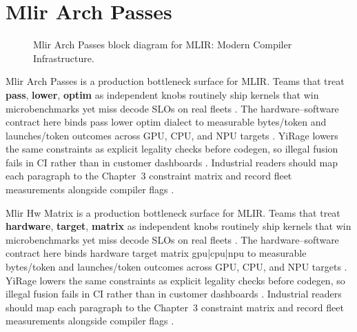 \section{Mlir Arch Passes}
\label{sec:mlir_arch_passes}
\begin{figure}[t]
\centering
{}
\caption{Mlir Arch Passes block diagram for MLIR: Modern Compiler Infrastructure.}
\label{fig:mlir_arch_passes_architecture}
\end{figure}


Mlir Arch Passes is a production bottleneck surface for MLIR. Teams that treat \textbf{pass}, \textbf{lower}, \textbf{optim} as independent knobs routinely ship kernels that win microbenchmarks yet miss decode SLOs on real fleets \citep{taxbreak2026,semianalysis2024tma}. The hardware--software contract here binds pass lower optim dialect to measurable bytes/token and launches/token outcomes across GPU, CPU, and NPU targets \citep{memoryfloor2026,amd2024xdna}. YiRage lowers the same constraints as explicit legality checks before codegen, so illegal fusion fails in CI rather than in customer dashboards \citep{nvidia2022hopper,amd2024aie}. Industrial readers should map each paragraph to the Chapter~3 constraint matrix and record fleet measurements alongside compiler flags \citep{semianalysis2024tma,dlbook}.

Mlir Hw Matrix is a production bottleneck surface for MLIR. Teams that treat \textbf{hardware}, \textbf{target}, \textbf{matrix} as independent knobs routinely ship kernels that win microbenchmarks yet miss decode SLOs on real fleets \citep{liu2024deepseekv3,memoryfloor2026}. The hardware--software contract here binds hardware target matrix gpu|cpu|npu to measurable bytes/token and launches/token outcomes across GPU, CPU, and NPU targets \citep{patel2025llminference,nvidia2022hopper}. YiRage lowers the same constraints as explicit legality checks before codegen, so illegal fusion fails in CI rather than in customer dashboards \citep{taxbreak2026,semianalysis2024tma}. Industrial readers should map each paragraph to the Chapter~3 constraint matrix and record fleet measurements alongside compiler flags \citep{memoryfloor2026,amd2024xdna}.

